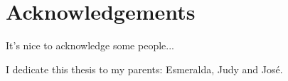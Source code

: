 \chapter{Acknowledgements}

It's nice to acknowledge some people...


I dedicate this thesis to my parents: Esmeralda, Judy and Jos\'e.